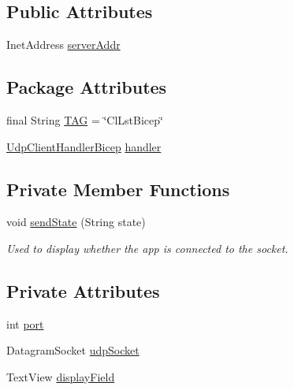 \subsection*{Public Attributes}
\begin{DoxyCompactItemize}
\item 
Inet\+Address \mbox{\hyperlink{classcom_1_1example_1_1trainawearapplication_1_1_client_listen_bicep_a02882f0c88f5713407dbf2630e1909ff}{server\+Addr}}
\end{DoxyCompactItemize}
\subsection*{Package Attributes}
\begin{DoxyCompactItemize}
\item 
final String \mbox{\hyperlink{classcom_1_1example_1_1trainawearapplication_1_1_client_listen_bicep_a4e84a959f390fef63c9e40b508f90ef1}{T\+AG}} = \char`\"{}Cl\+Lst\+Bicep\char`\"{}
\item 
\mbox{\hyperlink{classcom_1_1example_1_1trainawearapplication_1_1_udp_client_handler_bicep}{Udp\+Client\+Handler\+Bicep}} \mbox{\hyperlink{classcom_1_1example_1_1trainawearapplication_1_1_client_listen_bicep_a2df86596d25028c0c93c195e2ca8b695}{handler}}
\end{DoxyCompactItemize}
\subsection*{Private Member Functions}
\begin{DoxyCompactItemize}
\item 
void \mbox{\hyperlink{classcom_1_1example_1_1trainawearapplication_1_1_client_listen_bicep_a1a9854e6d93822ec317a1e4e2ef781cb}{send\+State}} (String state)
\begin{DoxyCompactList}\small\item\em Used to display whether the app is connected to the socket. \end{DoxyCompactList}\end{DoxyCompactItemize}
\subsection*{Private Attributes}
\begin{DoxyCompactItemize}
\item 
int \mbox{\hyperlink{classcom_1_1example_1_1trainawearapplication_1_1_client_listen_bicep_a5277e5a6fa795cd86dcc35b08952b17c}{port}}
\item 
Datagram\+Socket \mbox{\hyperlink{classcom_1_1example_1_1trainawearapplication_1_1_client_listen_bicep_aa43b7aebe53f1efa443f014fe5efc7ab}{udp\+Socket}}
\item 
Text\+View \mbox{\hyperlink{classcom_1_1example_1_1trainawearapplication_1_1_client_listen_bicep_a9634b0b5b3f74403071bf066606a0555}{display\+Field}}
\end{DoxyCompactItemize}


